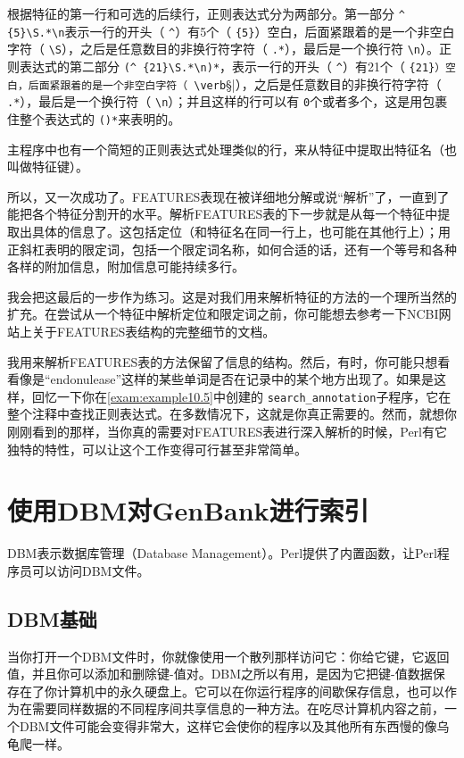 根据特征的第一行和可选的后续行，正则表达式分为两部分。第一部分 \verb|^ {5}\S.*\n|表示一行的开头（ \verb|^|）有5个（ \verb|{5}|）空白，后面紧跟着的是一个非空白字符（ \verb|\S|），之后是任意数目的非换行符字符（ \verb|.*|），最后是一个换行符 \verb|\n|）。正则表达式的第二部分 \verb|(^ {21}\S.*\n)*|，表示一行的开头（ \verb|^|）有21个（ \verb|{21}）空白，后面紧跟着的是一个非空白字符（ \verb|\S|），之后是任意数目的非换行符字符（ \verb|.*|），最后是一个换行符（ \verb|\n|）；并且这样的行可以有 \verb|0|个或者多个，这是用包裹住整个表达式的 \verb|()*|来表明的。

主程序中也有一个简短的正则表达式处理类似的行，来从特征中提取出特征名（也叫做特征键）。

所以，又一次成功了。FEATURES表现在被详细地分解或说“解析”了，一直到了能把各个特征分割开的水平。解析FEATURES表的下一步就是从每一个特征中提取出具体的信息了。这包括定位（和特征名在同一行上，也可能在其他行上）；用正斜杠表明的限定词，包括一个限定词名称，如何合适的话，还有一个等号和各种各样的附加信息，附加信息可能持续多行。

我会把这最后的一步作为练习。这是对我们用来解析特征的方法的一个理所当然的扩充。在尝试从一个特征中解析定位和限定词之前，你可能想去参考一下NCBI网站上关于FEATURES表结构的完整细节的文档。

我用来解析FEATURES表的方法保留了信息的结构。然后，有时，你可能只想看看像是“endonulease”这样的某些单词是否在记录中的某个地方出现了。如果是这样，回忆一下你在\autoref{exam:example10.5}中创建的 \verb|search_annotation|子程序，它在整个注释中查找正则表达式。在多数情况下，这就是你真正需要的。然而，就想你刚刚看到的那样，当你真的需要对FEATURES表进行深入解析的时候，Perl有它独特的特性，可以让这个工作变得可行甚至非常简单。

\section{使用DBM对GenBank进行索引}
DBM表示数据库管理（Database
Management）。Perl提供了内置函数，让Perl程序员可以访问DBM文件。

\subsection{DBM基础}
当你打开一个DBM文件时，你就像使用一个散列那样访问它：你给它键，它返回值，并且你可以添加和删除键-值对。DBM之所以有用，是因为它把键-值数据保存在了你计算机中的永久硬盘上。它可以在你运行程序的间歇保存信息，也可以作为在需要同样数据的不同程序间共享信息的一种方法。在吃尽计算机内容之前，一个DBM文件可能会变得非常大，这样它会使你的程序以及其他所有东西慢的像乌龟爬一样。

